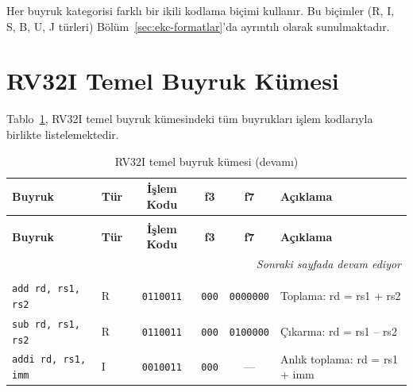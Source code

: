 Her buyruk kategorisi farklı bir ikili kodlama biçimi kullanır. Bu biçimler (R, I, S, B, U, J türleri) Bölüm~\ref{sec:ekc-formatlar}'da ayrıntılı olarak sunulmaktadır.

\section{RV32I Temel Buyruk Kümesi}
\label{sec:ekc-rv32i}

Tablo~\ref{tab:ekc-rv32i}, RV32I temel buyruk kümesindeki tüm buyrukları işlem kodlarıyla birlikte listelemektedir.

{\small
\begin{longtable}{@{}l@{\;}l@{\;}c@{\;}c@{\;}c@{\;}l@{}}
\caption{RV32I temel buyruk kümesi}\label{tab:ekc-rv32i}\\
\toprule
\textbf{Buyruk} & \textbf{Tür} & \textbf{İşlem Kodu} & \textbf{f3} & \textbf{f7} & \textbf{Açıklama} \\
\midrule
\endfirsthead

\caption[]{RV32I temel buyruk kümesi (devamı)}\\
\toprule
\textbf{Buyruk} & \textbf{Tür} & \textbf{İşlem Kodu} & \textbf{f3} & \textbf{f7} & \textbf{Açıklama} \\
\midrule
\endhead

\midrule
\multicolumn{6}{r}{\footnotesize\textit{Sonraki sayfada devam ediyor}} \\
\endfoot

\bottomrule
\endlastfoot

\multicolumn{6}{l}{\textbf{Aritmetik Buyruklar}}\index{aritmetik buyruklar} \\
\midrule
\texttt{add rd, rs1, rs2}   & R & \texttt{0110011} & \texttt{000} & \texttt{0000000} & Toplama: rd = rs1 + rs2 \\
\texttt{sub rd, rs1, rs2}   & R & \texttt{0110011} & \texttt{000} & \texttt{0100000} & Çıkarma: rd = rs1 -- rs2 \\
\texttt{addi rd, rs1, imm}  & I & \texttt{0010011} & \texttt{000} & ---          & Anlık toplama: rd = rs1 + imm \\
\midrule


\end{longtable}}
